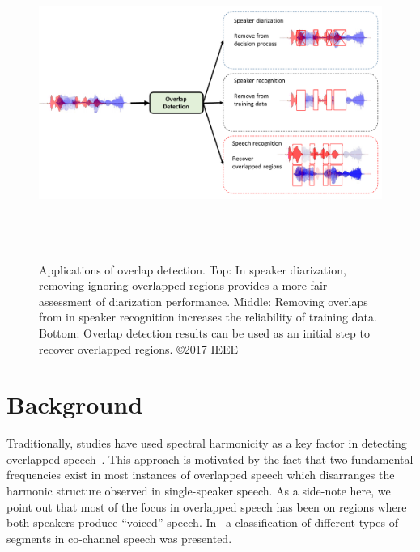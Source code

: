 \begin{figure}[h!]
	\centering
	\vspace{0mm}
	\includegraphics[height = 4in, width=1\textwidth]{figures/overlap_detection_applications}
	\vspace{-3mm}
	\caption{ Applications of overlap detection. Top: In speaker diarization, removing ignoring overlapped regions provides a more fair assessment of diarization performance. Middle: Removing overlaps from in speaker recognition increases the reliability of training data. Bottom: Overlap detection results can be used as an initial step to recover overlapped regions. \copyright 2017 IEEE}
	\label{fig:ch2_overlap_applications}
	\vspace{-3mm}
\end{figure}


\newpage
\section{Background}
\label{sec:ch2_methods}

Traditionally, studies have used spectral harmonicity as a key factor in detecting overlapped speech~\cite{nav_icassp13,smolenski_tut}. 
This approach is motivated by the fact that two fundamental frequencies exist in most instances of overlapped speech which disarranges the harmonic structure observed in single-speaker speech. 
As a side-note here, we point out that most of the focus in overlapped speech has been on regions where both speakers produce ``voiced'' speech. In~\cite{morgan_cochannel} a classification of different types of segments in co-channel speech was presented.

